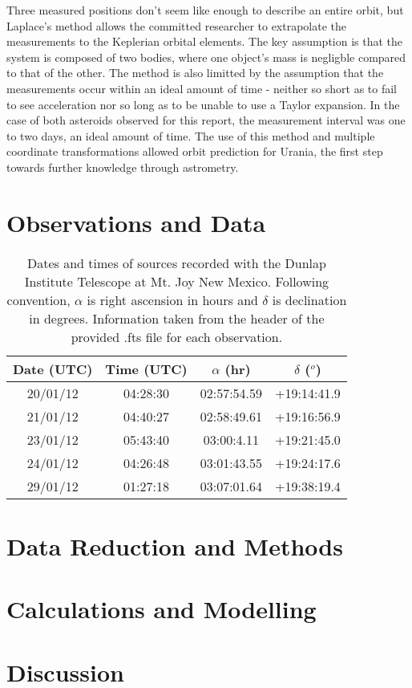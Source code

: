 \documentclass[a4paper,12pt]{article}
\begin{document}
Three measured positions don't seem like enough to describe an entire orbit, but Laplace's method allows the committed researcher to extrapolate the measurements to the Keplerian orbital elements. The key assumption is that the system is composed of two bodies, where one object's mass is negligble compared to that of the other. The method is also limitted by the assumption that the measurements occur within an ideal amount of time - neither so short as to fail to see acceleration nor so long as to be unable to use a Taylor expansion. In the case of both asteroids observed for this report, the measurement interval was one to two days, an ideal amount of time. The use of this method and multiple coordinate transformations allowed orbit prediction for Urania, the first step towards further knowledge through astrometry.


\section{Observations and Data}
\label{sec:obs}

\begin{table}[!htbp]
  \centering
  \begin{tabular}{c||c||c||c}
   Date (UTC) & Time (UTC) & $\alpha$ (hr) & $\delta$ ($^o$) \\
   \hline
   \hline
   20/01/12 & 04:28:30 & 02:57:54.59 & +19:14:41.9 \\
   \hline
   21/01/12 & 04:40:27 & 02:58:49.61 & +19:16:56.9 \\
   \hline
   23/01/12 & 05:43:40 & 03:00:4.11 & +19:21:45.0 \\
   \hline
   24/01/12 & 04:26:48 & 03:01:43.55 & +19:24:17.6 \\
   \hline
   29/01/12 & 01:27:18 & 03:07:01.64 & +19:38:19.4 \\
   \end{tabular}
    \caption{Dates and times of sources recorded with the Dunlap Institute Telescope at Mt. Joy New Mexico. Following convention, $\alpha$ is right ascension in hours and $\delta$ is declination in degrees. Information taken from the header of the provided .fts file for each observation.}
    \label{tab:datatable}
\end{table}


\section{Data Reduction and Methods}
\label{sec:data}


\section{Calculations and Modelling}
\label{sec:calc}


\section{Discussion}
\label{sec:discussion}




\end{document}

